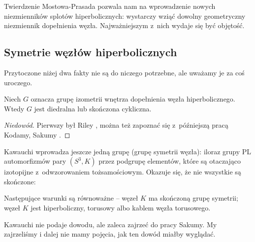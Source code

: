 Twierdzenie Mostowa-Prasada pozwala nam na wprowadzenie nowych niezmienników splotów hiperbolicznych: wystarczy wziąć dowolny geometryczny niezmiennik dopełnienia węzła.
Najważniejszym z~nich wydaje się być objętość.



\subsection{Symetrie węzłów hiperbolicznych}
Przytoczone niżej dwa fakty nie są do niczego potrzebne, ale uważamy je za coś uroczego.

\begin{proposition}
    Niech $G$ oznacza grupę izometrii wnętrza dopełnienia węzła hiperbolicznego.
    Wtedy $G$ jest diedralna lub skończona cykliczna.
\end{proposition}

\begin{proof}[Niedowód]
%
%
%
    Pierwszy był Riley \cite[s. 124]{riley1979}, można też zapoznać się z~późniejszą pracą Kodamy, Sakumy \cite{kodama1992}.
\end{proof}

Kawauchi \cite[s. 131]{kawauchi1996} wprowadza jeszcze jedną grupę (grupę symetrii węzła): iloraz grupy PL automorfizmów pary $(S^3, K)$ przez podgrupę elementów, które są otaczająco izotopijne z~odwzorowaniem tożsamościowym.
Okazuje się, że nie wszystkie są skończone:

\begin{proposition}
    Następujące warunki są równoważne -- węzeł $K$ ma skończoną grupę symetrii; węzeł $K$ jest hiperboliczny, torusowy albo kablem węzła torusowego.
\end{proposition}

Kawauchi nie podaje dowodu, ale zaleca zajrzeć do pracy Sakumy.
My zajrzeliśmy i dalej nie mamy pojęcia, jak ten dowód miałby wyglądać.



